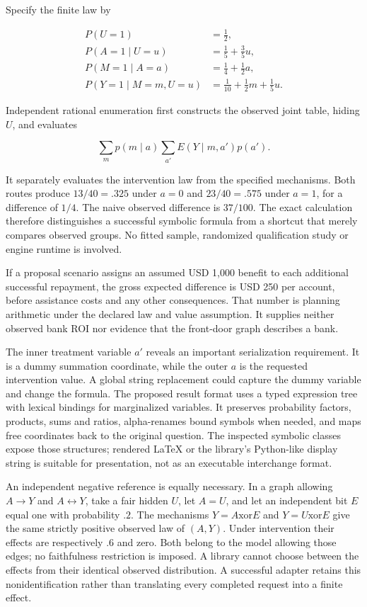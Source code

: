 Specify the finite law by

\[
 \begin{aligned}
 P(U=1)&=\tfrac12,\\
 P(A=1\mid U=u)&=\tfrac15+\tfrac35u,\\
 P(M=1\mid A=a)&=\tfrac14+\tfrac12a,\\
 P(Y=1\mid M=m,U=u)&=\tfrac1{10}+\tfrac12m+\tfrac15u.
 \end{aligned}
\]

Independent rational enumeration first constructs the observed joint
table, hiding \(U\), and evaluates

\[
 \sum_m p(m\mid a)\sum_{a'}E(Y\mid m,a')p(a').
\]

It separately evaluates the intervention law from the specified
mechanisms. Both routes produce \(13/40=.325\) under \(a=0\) and
\(23/40=.575\) under \(a=1\), for a difference of \(1/4\). The naive
observed difference is \(37/100\). The exact calculation therefore
distinguishes a successful symbolic formula from a shortcut that merely
compares observed groups. No fitted sample, randomized qualification
study or engine runtime is involved. \citep{exec13_y0_oracles}

If a proposal scenario assigns an assumed USD 1,000 benefit to each
additional successful repayment, the gross expected difference is USD
250 per account, before assistance costs and any other consequences.
That number is planning arithmetic under the declared law and value
assumption. It supplies neither observed bank ROI nor evidence that the
front-door graph describes a bank.

The inner treatment variable \(a'\) reveals an important serialization
requirement. It is a dummy summation coordinate, while the outer \(a\)
is the requested intervention value. A global string replacement could
capture the dummy variable and change the formula. The proposed result
format uses a typed expression tree with lexical bindings for
marginalized variables. It preserves probability factors, products, sums
and ratios, alpha-renames bound symbols when needed, and maps free
coordinates back to the original question. The inspected symbolic
classes expose those structures; rendered LaTeX or the library's
Python-like display string is suitable for presentation, not as an
executable interchange format. \citep{exec13_y0_dsl}

An independent negative reference is equally necessary. In a graph
allowing \(A\to Y\) and \(A\leftrightarrow Y\), take a fair hidden
\(U\), let \(A=U\), and let an independent bit \(E\) equal one with
probability \(.2\). The mechanisms \(Y=A\mathbin{\mathrm{xor}}E\) and
\(Y=U\mathbin{\mathrm{xor}}E\) give the same strictly positive observed
law of \((A,Y)\). Under intervention their effects are respectively
\(.6\) and zero. Both belong to the model allowing those edges; no
faithfulness restriction is imposed. A library cannot choose between the
effects from their identical observed distribution. A successful adapter
retains this nonidentification rather than translating every completed
request into a finite effect. \citep{exec13_y0_oracles}

